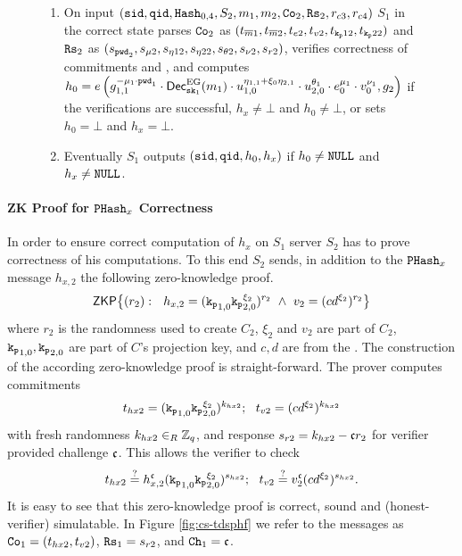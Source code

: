 \begin{figure}[htbp]
\begin{mdframed}[innertopmargin=10pt]
\begin{enumerate}
	    \item On input $(\mathtt{sid},\mathtt{qid},\mathtt{Hash}_{0,4},S_2, m_1, m_2, \mathtt{Co}_2, \mathtt{Rs}_2, r_{c3}, r_{c4})$ $S_1$ in the correct state parses $\mathtt{Co}_{2}$ as $(t_{\overline{m}1}, t_{\overline{m}2}, t_{e2}, t_{v2}, t_{\mathtt{k_p}12}, t_{\mathtt{k_p}22})$ and $\mathtt{Rs}_{2}$ as $(s_{\mathtt{pwd}_2}, s_{\mu2}, s_{\eta12}, s_{\eta22}, s_{\theta2}, s_{\nu2}, s_{r2})$, verifies correctness of commitments and \ZKP , and computes
	      $h_0 = e\left( g_{1,1}^{-\mu_1\cdot \mathtt{pwd}_1} \cdot \mathsf{Dec}_{\mathtt{sk}_1}^\mathrm{EG}(m_1) \cdot u_{1,0}^{\eta_{1,1}+\xi_0\eta_{2,1}} \cdot u_{2,0}^{\theta_1} \cdot e_0^{\mu_1} \cdot v_0^{\nu_1}, g_2 \right)$ if the verifications are successful, $h_x\not=\bot$ and $h_0\not=\bot$, or sets $h_0=\bot$ and $h_x=\bot$.
	    
	    \item Eventually $S_1$ outputs $(\mathtt{sid}, \mathtt{qid}, h_0, h_x)$ if $h_0\not=\mathtt{NULL}$ and $h_x\not=\mathtt{NULL}$.
	  \end{enumerate}
	  	
\end{mdframed}
\end{figure}

\paragraph{ZK Proof for $\mathtt{PHash}_x$ Correctness}
In order to ensure correct computation of $h_x$ on $S_1$ server $S_2$ has to prove correctness of his computations.
To this end $S_2$ sends, in addition to the $\mathtt{PHash}_x$ message $h_{x,2}$ the following zero-knowledge proof.
\begin{equation}
    \mathsf{ZKP}\big\{ (r_2):~~ h_{x,2} = (\mathtt{k_p}_{1,0} \mathtt{k_p}_{2,0}^{\xi_2})^{r_2} ~ \wedge ~ v_2=(cd^{\xi_2})^{r_2} \big\}
\end{equation}
where $r_2$ is the randomness used to create $C_2$, $\xi_2$ and $v_2$ are part of $C_2$, $\mathtt{k_p}_{1,0},\mathtt{k_p}_{2,0}$ are part of $C$'s projection key, and $c,d$ are from the \crs.
The construction of the according zero-knowledge proof is straight-forward. 
The prover computes commitments
\[ t_{hx2} = (\mathtt{k_p}_{1,0} \mathtt{k_p}_{2,0}^{\xi_2})^{k_{hx2}}; ~~ t_{v2} = (cd^{\xi_2})^{k_{hx2}} \]
with fresh randomness $k_{hx2}\in_R\mathbb{Z}_q$, and response $s_{r2} = k_{hx2} - \mathfrak{c} r_2$ for verifier provided challenge $\mathfrak{c}$.
This allows the verifier to check
\[ t_{hx2} \stackrel{?}{=} h_{x,2}^\mathfrak{c} (\mathtt{k_p}_{1,0} \mathtt{k_p}_{2,0}^{\xi_2})^{s_{hx2}}; ~~ t_{v2} \stackrel{?}{=} v_2^\mathfrak{c} (cd^{\xi_2})^{s_{hx2}}. \]
It is easy to see that this zero-knowledge proof is correct, sound and (honest-verifier) simulatable.
In Figure \ref{fig:cs-tdsphf} we refer to the messages as $\mathtt{Co}_{1}=(t_{hx2}, t_{v2})$, $\mathtt{Rs}_{1}=s_{r2}$, and $\mathtt{Ch}_{1}=\mathfrak{c}$.


